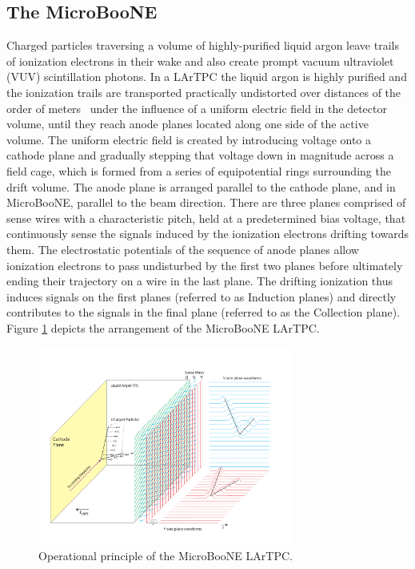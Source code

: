 \subsection{The MicroBooNE \lartpc}

Charged particles traversing a volume of highly-purified liquid argon leave trails of ionization electrons in their wake and also create prompt vacuum ultraviolet (VUV) scintillation photons.  In a LArTPC the liquid argon is highly purified and the ionization trails are transported practically undistorted over distances of the order of meters~\cite{Aprile:1985} under the influence of a uniform electric field in the detector volume, until they reach anode planes located along one side of the active volume.   The uniform electric field is created by introducing voltage onto a cathode plane and gradually stepping that voltage down in magnitude across a field cage, which is formed from a series of equipotential rings surrounding the drift volume.  The anode plane is arranged parallel to the cathode plane, and in MicroBooNE, parallel to the beam direction.   There are three planes comprised of sense wires with a characteristic pitch, held at a predetermined bias voltage, that continuously sense the signals induced by the ionization electrons drifting towards them. The electrostatic potentials of the sequence of anode planes allow ionization electrons to pass undisturbed by the first two planes before ultimately ending their trajectory on a wire in the last plane. The drifting ionization thus induces signals on the first planes (referred to as Induction planes) and directly contributes to the signals in the final plane (referred to as the Collection plane).  Figure \ref{fig:lartpc} depicts the arrangement of the MicroBooNE LArTPC.


\begin{figure}
\centering 
\includegraphics[width=0.75\textwidth]{figures/LArTPC_Concept}
\caption{Operational principle of the MicroBooNE LArTPC.}
\label{fig:lartpc}
\end{figure}


